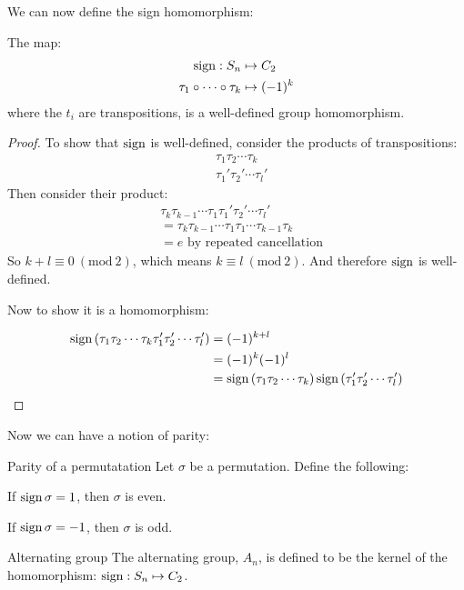 \documentclass[../Main.tex]{subfiles}
\begin{document}
We can now define the sign homomorphism:
\begin{theorem}
    The map:
    \begin{align*}
        \operatorname{sign} : S_n &\mapsto C_2 \\
        \tau_1 \circ \cdots \circ \tau_k &\mapsto (-1)^k
    \end{align*}
    where the $t_i$ are transpositions, is a well-defined group homomorphism.
    \label{thmSignHism}
\end{theorem}
\begin{proof}
    To show that $\operatorname{sign}$ is well-defined, consider the products of transpositions:
    \begin{align*}
        &\tau_1 \tau_2 \cdots \tau_k \\
        &\tau_1' \tau_2' \cdots \tau_l'
    \end{align*}
    Then consider their product:
    \begin{align*}
        &\tau_k \tau_{k-1} \cdots \tau_1 \tau_1' \tau_2' \cdots \tau_l' \\
        &= \tau_k \tau_{k-1} \cdots \tau_1 \tau_1 \cdots \tau_{k-1} \tau_k \\
        &= e \text{ by repeated cancellation}
    \end{align*}
    So $k + l \equiv 0~(\text{mod}~2)$, which means $k \equiv l~(\text{mod}~2)$. And therefore $\operatorname{sign}$ is well-defined.\par
    Now to show it is a homomorphism:\par
    \begin{align*}
        \operatorname{sign}{(\tau_1 \tau_2 \cdots \tau_k \tau_1' \tau_2' \cdots \tau_l')} &= (-1)^{k + l} \\
        &= (-1)^k (-1)^l \\
        &= \operatorname{sign}{(\tau_1 \tau_2 \cdots \tau_k)} \operatorname{sign}{(\tau_1' \tau_2' \cdots \tau_l')}
    \end{align*}
\end{proof}
Now we can have a notion of parity:
\begin{definition}{Parity of a permutatation}
    Let $\sigma$ be a permutation. Define the following:\par
    If $\operatorname{sign}{\sigma} = 1$, then $\sigma$ is even. \par
    If $\operatorname{sign}{\sigma} = -1$, then $\sigma$ is odd.
\end{definition}
\begin{definition}{Alternating group}
    The alternating group, $A_n$, is defined to be the kernel of the homomorphism:
    $\operatorname{sign} : S_n \mapsto C_2$.    
\end{definition}
\end{document}
